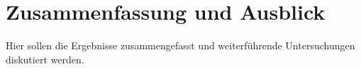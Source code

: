 \chapter{Zusammenfassung und Ausblick}

Hier sollen die Ergebnisse zusammengefasst und weiterf\"uhrende Untersuchungen diskutiert werden. 